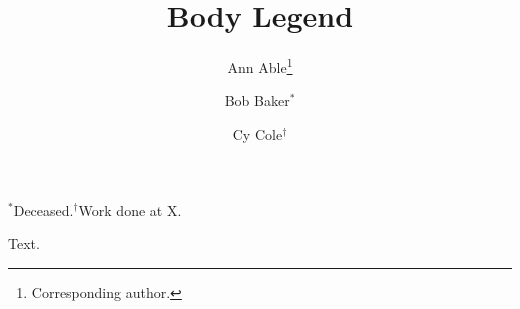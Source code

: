\documentclass{article}
\title{Body Legend}
\author{Ann Able\thanks{Corresponding author.} \and Bob Baker$^{*}$ \and Cy Cole$^{\dagger}$}
\date{}
\begin{document}
\maketitle
\begin{center}$^{*}$Deceased.\quad $^{\dagger}$Work done at X.\end{center}
Text.
\end{document}
